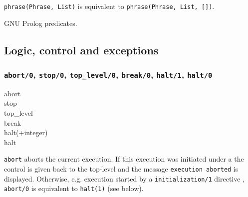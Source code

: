 \texttt{phrase(Phrase, List)} is equivalent to
\texttt{phrase(Phrase, List, [])}.

\begin{PlErrors}





\end{PlErrors}

\Portability

GNU Prolog predicates.

\subsection{Logic, control and exceptions}

\subsubsection{\texttt{abort/0},
               \texttt{stop/0},
               \texttt{top\_level/0},
               \texttt{break/0},
               \texttt{halt/1},
               \texttt{halt/0}}
\label{abort/0}

\begin{TemplatesOneCol}
abort\\
stop\\
top\_level\\
break\\
halt(+integer)\\
halt

\end{TemplatesOneCol}

\Description

\texttt{abort} aborts the current execution. If this execution was initiated
under a  the control is given back to the top-level and the
message \texttt{{\lb}execution aborted{\rb}} is displayed. Otherwise,
e.g. execution started by a \texttt{initialization/1} directive
, \texttt{abort/0} is equivalent to
\texttt{halt(1)} (see below).

